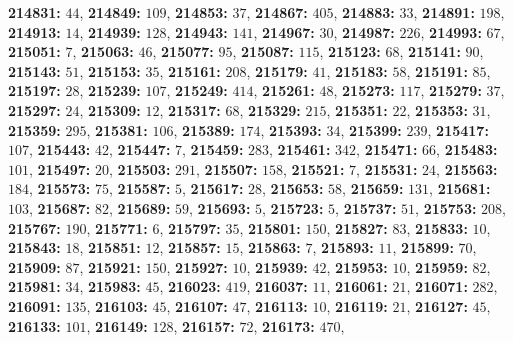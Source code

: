 \textsf{\bfseries 214831:} $44$, \textsf{\bfseries 214849:} $109$, \textsf{\bfseries 214853:} $37$, \textsf{\bfseries 214867:} $405$, \textsf{\bfseries 214883:} $33$, \textsf{\bfseries 214891:} $198$, \textsf{\bfseries 214913:} $14$, \textsf{\bfseries 214939:} $128$, \textsf{\bfseries 214943:} $141$, \textsf{\bfseries 214967:} $30$, \textsf{\bfseries 214987:} $226$, \textsf{\bfseries 214993:} $67$, \textsf{\bfseries 215051:} $7$, \textsf{\bfseries 215063:} $46$, \textsf{\bfseries 215077:} $95$, \textsf{\bfseries 215087:} $115$, \textsf{\bfseries 215123:} $68$, \textsf{\bfseries 215141:} $90$, \textsf{\bfseries 215143:} $51$, \textsf{\bfseries 215153:} $35$, \textsf{\bfseries 215161:} $208$, \textsf{\bfseries 215179:} $41$, \textsf{\bfseries 215183:} $58$, \textsf{\bfseries 215191:} $85$, \textsf{\bfseries 215197:} $28$, \textsf{\bfseries 215239:} $107$, \textsf{\bfseries 215249:} $414$, \textsf{\bfseries 215261:} $48$, \textsf{\bfseries 215273:} $117$, \textsf{\bfseries 215279:} $37$, \textsf{\bfseries 215297:} $24$, \textsf{\bfseries 215309:} $12$, \textsf{\bfseries 215317:} $68$, \textsf{\bfseries 215329:} $215$, \textsf{\bfseries 215351:} $22$, \textsf{\bfseries 215353:} $31$, \textsf{\bfseries 215359:} $295$, \textsf{\bfseries 215381:} $106$, \textsf{\bfseries 215389:} $174$, \textsf{\bfseries 215393:} $34$, \textsf{\bfseries 215399:} $239$, \textsf{\bfseries 215417:} $107$, \textsf{\bfseries 215443:} $42$, \textsf{\bfseries 215447:} $7$, \textsf{\bfseries 215459:} $283$, \textsf{\bfseries 215461:} $342$, \textsf{\bfseries 215471:} $66$, \textsf{\bfseries 215483:} $101$, \textsf{\bfseries 215497:} $20$, \textsf{\bfseries 215503:} $291$, \textsf{\bfseries 215507:} $158$, \textsf{\bfseries 215521:} $7$, \textsf{\bfseries 215531:} $24$, \textsf{\bfseries 215563:} $184$, \textsf{\bfseries 215573:} $75$, \textsf{\bfseries 215587:} $5$, \textsf{\bfseries 215617:} $28$, \textsf{\bfseries 215653:} $58$, \textsf{\bfseries 215659:} $131$, \textsf{\bfseries 215681:} $103$, \textsf{\bfseries 215687:} $82$, \textsf{\bfseries 215689:} $59$, \textsf{\bfseries 215693:} $5$, \textsf{\bfseries 215723:} $5$, \textsf{\bfseries 215737:} $51$, \textsf{\bfseries 215753:} $208$, \textsf{\bfseries 215767:} $190$, \textsf{\bfseries 215771:} $6$, \textsf{\bfseries 215797:} $35$, \textsf{\bfseries 215801:} $150$, \textsf{\bfseries 215827:} $83$, \textsf{\bfseries 215833:} $10$, \textsf{\bfseries 215843:} $18$, \textsf{\bfseries 215851:} $12$, \textsf{\bfseries 215857:} $15$, \textsf{\bfseries 215863:} $7$, \textsf{\bfseries 215893:} $11$, \textsf{\bfseries 215899:} $70$, \textsf{\bfseries 215909:} $87$, \textsf{\bfseries 215921:} $150$, \textsf{\bfseries 215927:} $10$, \textsf{\bfseries 215939:} $42$, \textsf{\bfseries 215953:} $10$, \textsf{\bfseries 215959:} $82$, \textsf{\bfseries 215981:} $34$, \textsf{\bfseries 215983:} $45$, \textsf{\bfseries 216023:} $419$, \textsf{\bfseries 216037:} $11$, \textsf{\bfseries 216061:} $21$, \textsf{\bfseries 216071:} $282$, \textsf{\bfseries 216091:} $135$, \textsf{\bfseries 216103:} $45$, \textsf{\bfseries 216107:} $47$, \textsf{\bfseries 216113:} $10$, \textsf{\bfseries 216119:} $21$, \textsf{\bfseries 216127:} $45$, \textsf{\bfseries 216133:} $101$, \textsf{\bfseries 216149:} $128$, \textsf{\bfseries 216157:} $72$, \textsf{\bfseries 216173:} $470$, 
